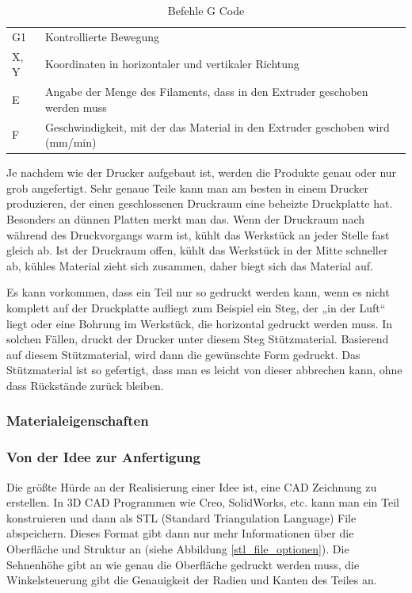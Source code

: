 			\begin{table}[htbp]
  		\centering
  		\caption{Befehle G Code}
	    \begin{tabular}{ll}
	    G1    & Kontrollierte Bewegung \\
	    X, Y  & Koordinaten in horizontaler und vertikaler Richtung \\
	    E     & Angabe der Menge des Filaments, dass in den Extruder geschoben werden muss \\
	    F     & Geschwindigkeit, mit der das Material in den Extruder geschoben wird (mm/min) \\
	    \end{tabular}%
	  	\label{tab:befehle gcode}%
			\end{table}%

		Je nachdem wie der Drucker aufgebaut ist, werden die Produkte genau oder nur grob angefertigt. Sehr genaue Teile kann man am besten in einem Drucker produzieren, der einen geschlossenen Druckraum \bzw eine beheizte Druckplatte hat.
		Besonders an dünnen Platten merkt man das. Wenn der Druckraum nach \bzw während des Druckvorgangs warm ist, kühlt das Werkstück an jeder Stelle fast gleich ab.
		Ist der Druckraum offen, kühlt das Werkstück in der Mitte schneller ab, kühles Material zieht sich zusammen, daher biegt sich das Material auf.

			\newpage

		Es kann vorkommen, dass ein Teil nur so gedruckt werden kann, wenn es nicht komplett auf der Druckplatte aufliegt zum Beispiel ein Steg, der „in der Luft“ liegt oder eine Bohrung im Werkstück, die horizontal gedruckt werden muss.
		In solchen Fällen, druckt der Drucker unter diesem Steg Stützmaterial. Basierend auf diesem Stützmaterial, wird dann die gewünschte Form gedruckt.
		Das Stützmaterial ist so gefertigt, dass man es leicht von dieser abbrechen kann, ohne dass Rückstände zurück bleiben.

		\subsubsection{Materialeigenschaften}

		\subsubsection{Von der Idee zur Anfertigung}

		Die größte Hürde an der Realisierung einer Idee ist, eine CAD Zeichnung zu erstellen. In 3D CAD Programmen wie Creo, SolidWorks, etc. kann man ein Teil konstruieren und dann als STL (Standard Triangulation Language) File abspeichern.
		Dieses Format gibt dann nur mehr Informationen über die Oberfläche und Struktur an (siehe Abbildung \ref{stl_file_optionen}).
		Die Sehnenhöhe gibt an wie genau die Oberfläche gedruckt werden muss, die Winkelsteuerung gibt die Genauigkeit der Radien und Kanten des Teiles an.


